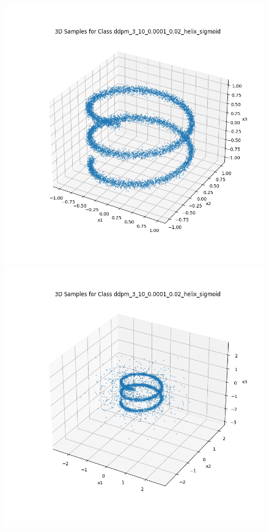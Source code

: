 \documentclass[a4paper,12pt]{article}
\begin{document}
\begin{figure}[H]
  \centering
  \begin{minipage}{0.3\textwidth}
      \centering
      \includegraphics[width=\linewidth]{images/helix.png}
  \end{minipage}
  \begin{minipage}{0.3\textwidth}
      \centering
      \includegraphics[width=\linewidth]{"images/Samples for ddpm_3_10_0.0001_0.02_helix_sigmoid.png"}

\end{minipage}
\end{figure}
\end{document}
